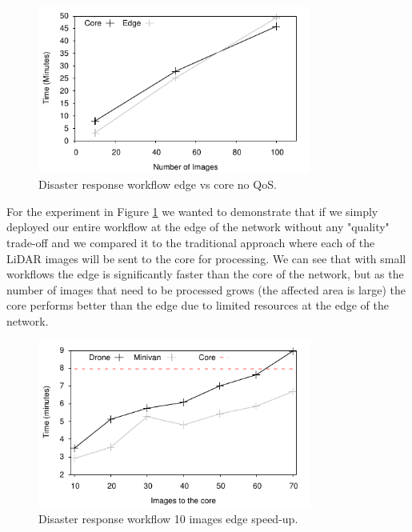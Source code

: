 \begin{figure}[h]
  \centering
  \includegraphics[width=0.8\textwidth]{Results/EdgeVCore}
  \caption{Disaster response workflow edge vs core no QoS.}
  \label{fig:Edge_CoreVsCloud}
\end{figure}

For the experiment in Figure \ref{fig:Edge_CoreVsCloud} we wanted to demonstrate that if we simply deployed our entire workflow at the edge of the network without any "quality" trade-off and we compared it to the traditional approach where each of the LiDAR images will be sent to the core for processing. We can see that with small workflows the edge is significantly faster than the core of the network, but as the number of images that need to be processed grows (the affected area is large) the core performs better than the edge due to limited resources at the edge of the network.

\begin{figure}[h!]
  \centering
  \includegraphics[width=0.8\textwidth]{Results/SmallSpeed}
  \caption{Disaster response workflow 10 images edge speed-up.}
  \label{fig:SmallSpeed}
\end{figure}

